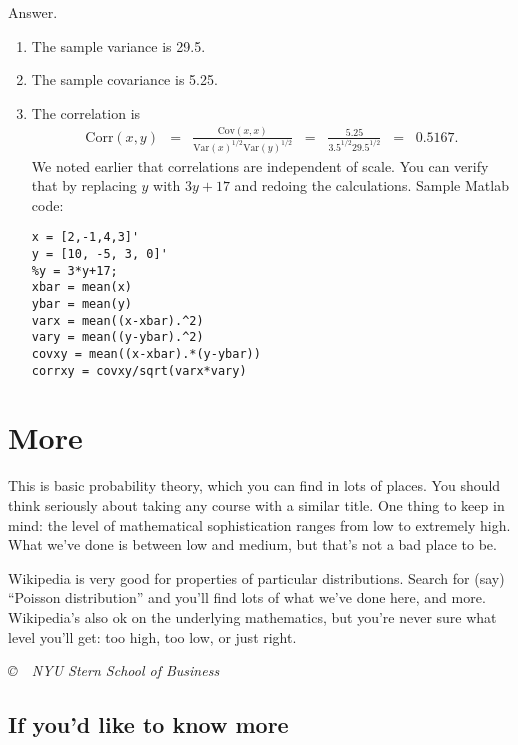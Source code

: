 \begin{enumerate}
Answer.
\begin{enumerate}
\item The sample variance is 29.5.
\item The sample covariance is 5.25.
\item The correlation is
\begin{eqnarray*}
    \mbox{Corr}(x,y) &=&
            \frac {\mbox{Cov}(x,x)} {\mbox{Var}(x)^{1/2} \mbox{Var}(y)^{1/2} }
            \;\;=\;\; \frac{ 5.25} {3.5^{1/2} 29.5^{1/2}}
            \;\;=\;\; 0.5167 .
\end{eqnarray*}
We noted earlier that correlations are independent of scale.
You can verify that by replacing $y$ with $ 3y+17$ and redoing the calculations.
Sample Matlab code:
\begin{verbatim}
x = [2,-1,4,3]'
y = [10, -5, 3, 0]'
%y = 3*y+17;
xbar = mean(x)
ybar = mean(y)
varx = mean((x-xbar).^2)
vary = mean((y-ybar).^2)
covxy = mean((x-xbar).*(y-ybar))
corrxy = covxy/sqrt(varx*vary)
\end{verbatim}
\end{enumerate}



\end{enumerate}


\section*{More}

This is basic probability theory, which you can find in lots of places.
You should think seriously about taking any course with a similar title.
One thing to keep in mind:
the level of mathematical sophistication ranges from low to extremely high.
What we've done is between low and medium, but that's not a bad place to be.

Wikipedia is very good for properties of particular distributions.
Search for (say) ``Poisson distribution'' and you'll find lots of what we've done here,
and more.
Wikipedia's also ok on the underlying mathematics, but you're never sure what
level you'll get:  too high, too low, or just right.


\vfill \centerline{\it \copyright \ \number\year \
NYU Stern School of Business}



\subsection*{If you'd like to know more}

